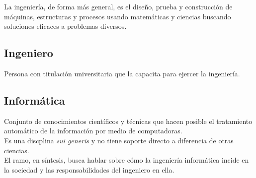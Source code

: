 La ingeniería, de forma más general, es el diseño, prueba y
construcción de máquinas, estructuras y procesos usando
matemáticas y ciencias buscando soluciones eficaces a
problemas diversos.

\subsection*{Ingeniero}
Persona con titulación universitaria que la capacita para
ejercer la ingeniería.

\subsection*{Informática}
Conjunto de conocimientos científicos y técnicas que hacen
posible el tratamiento automático de la información por
medio de computadoras.\\

Es una discplina \textit{sui generis} y no tiene soporte
directo a diferencia de otras ciencias.\\

El ramo, en síntesis, busca hablar sobre cómo la ingeniería
informática incide en la sociedad y las responsabilidades
del ingeniero en ella.
